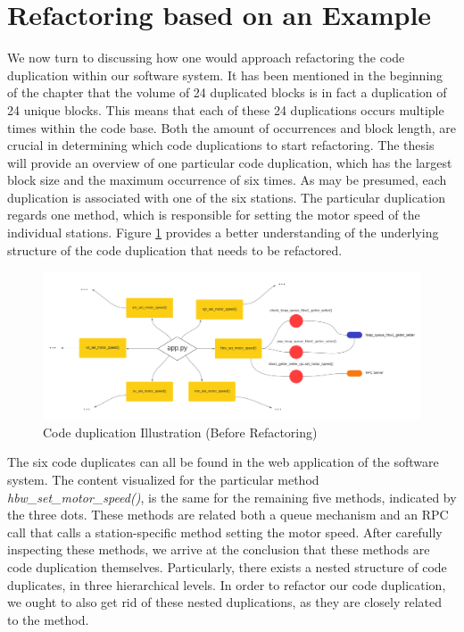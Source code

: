 \section{Refactoring based on an Example}

We now turn to discussing how one would approach refactoring the code duplication within our software system. It has been mentioned in the beginning of the chapter that the volume of 24 duplicated blocks is in fact a duplication of 24 unique blocks. This means that each of these 24 duplications occurs multiple times within the code base. Both the amount of occurrences and block length, are crucial in determining which code duplications to start refactoring. The thesis will provide an overview of one particular code duplication, which has the largest block size and the maximum occurrence of six times. As may be presumed, each duplication is associated with one of the six stations. The particular duplication regards one method, which is responsible for setting the motor speed of the individual stations. Figure \ref{fig:pre-refactor} provides a better understanding of the underlying structure of the code duplication that needs to be refactored. 

\begin{figure}[htp]
    \centering
    \includegraphics[width=\textwidth]{./assets/board_extended}
    \caption{Code duplication Illustration (Before Refactoring)}
    \label{fig:pre-refactor}
\end{figure}

The six code duplicates can all be found in the web application of the software system. The content visualized for the particular method \emph{hbw\_set\_motor\_speed()}, is the same for the remaining five methods, indicated by the three dots. These methods are related both a queue mechanism and an RPC call that calls a station-specific method setting the motor speed. After carefully inspecting these methods, we arrive at the conclusion that these methods are code duplication themselves. Particularly, there exists a nested structure of code duplicates, in three hierarchical levels. In order to refactor our code duplication, we ought to also get rid of these nested duplications, as they are closely related to the method. 


